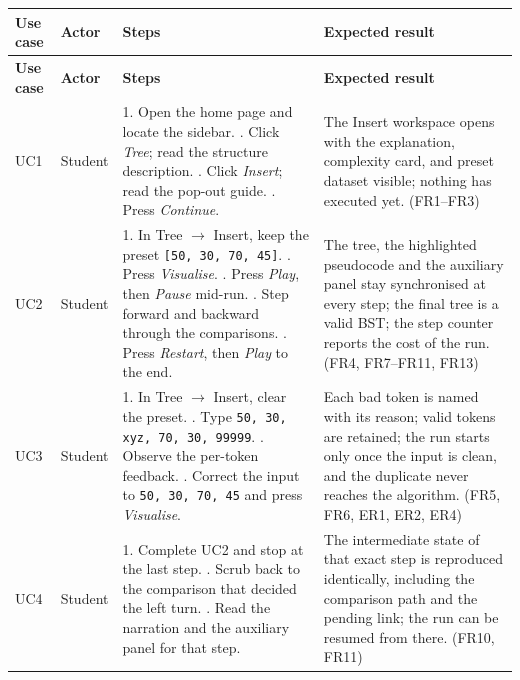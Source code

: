 \documentclass[11pt,a4paper]{article}
\newcommand{\ct}[1]{\texttt{#1}}
\begin{document}
\begin{center}
\small
\setlength{\tabcolsep}{3pt}
\begin{longtable}{@{}L{1.1cm}L{1.7cm}L{7.6cm}L{4.7cm}@{}}
\toprule
\textbf{Use case} & \textbf{Actor} & \textbf{Steps} & \textbf{Expected result} \\
\midrule
\endfirsthead
\toprule
\textbf{Use case} & \textbf{Actor} & \textbf{Steps} & \textbf{Expected result} \\
\midrule
\endhead
\bottomrule
\endlastfoot

UC1 & Student &
1. Open the home page and locate the sidebar. . Click \emph{Tree}; read the structure description. . Click \emph{Insert}; read the pop-out guide. . Press \emph{Continue}. &
The Insert workspace opens with the explanation, complexity card, and preset dataset
visible; nothing has executed yet. (FR1--FR3) \\

UC2 & Student &
1. In Tree $\rightarrow$ Insert, keep the preset \ct{[50, 30, 70, 45]}. . Press \emph{Visualise}. . Press \emph{Play}, then \emph{Pause} mid-run. . Step forward and backward through the comparisons. . Press \emph{Restart}, then \emph{Play} to the end. &
The tree, the highlighted pseudocode and the auxiliary panel stay synchronised at every
step; the final tree is a valid BST; the step counter reports the cost of the run.
(FR4, FR7--FR11, FR13) \\

UC3 & Student &
1. In Tree $\rightarrow$ Insert, clear the preset. . Type \ct{50, 30, xyz, 70, 30, 99999}. . Observe the per-token feedback. . Correct the input to \ct{50, 30, 70, 45} and press \emph{Visualise}. &
Each bad token is named with its reason; valid tokens are retained; the run starts only
once the input is clean, and the duplicate never reaches the algorithm.
(FR5, FR6, ER1, ER2, ER4) \\

UC4 & Student &
1. Complete UC2 and stop at the last step. . Scrub back to the comparison that decided the left turn. . Read the narration and the auxiliary panel for that step. &
The intermediate state of that exact step is reproduced identically, including the
comparison path and the pending link; the run can be resumed from there. (FR10, FR11) \\


\end{longtable}
\end{center}
\end{document}
